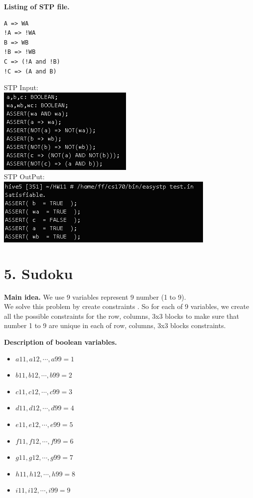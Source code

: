 \documentclass[11pt]{article}
\begin{document}
\noindent
\textbf{Listing of STP file.}
\begin{verbatim}
A => WA
!A => !WA 
B => WB
!B => !WB
C => (!A and !B)
!C => (A and B)
\end{verbatim}
STP Input:\\
\includegraphics[scale=1]{in4.PNG}\\
STP OutPut:\\
\includegraphics[scale=1]{out4.PNG}
\newpage
\section*{5. Sudoku}

\noindent
\textbf{Main idea.}
We use 9 variables represent 9 number (1 to 9).\\
We solve this problem by create constraints . So for each of 9 variables, we create all the possible constraints for the row, columns, 3x3 blocks to make sure that number 1 to 9 are unique in each of row, columns, 3x3 blocks constraints.

\noindent
\textbf{Description of boolean variables.}
\begin{itemize}
\item $a11,a12,\cdots, a99 = 1$
\item $b11,b12,\cdots, b99 = 2$
\item $c11,c12,\cdots, c99 = 3$
\item $d11,d12,\cdots, d99 = 4$
\item $e11,e12,\cdots, e99 = 5$
\item $f11,f12,\cdots, f99 = 6$
\item $g11,g12,\cdots, g99 = 7$
\item $h11,h12,\cdots, h99 = 8$
\item $i11,i12,\cdots, i99 = 9$
\end{itemize}
\end{document}
